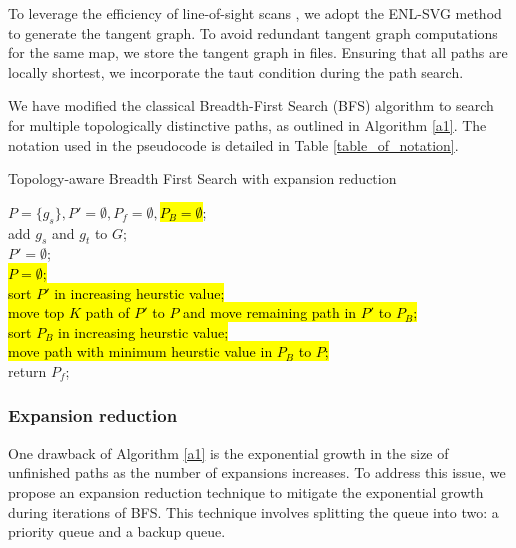 \documentclass[lettersize,journal]{IEEEtran}
\begin{document}
To leverage the efficiency of line-of-sight scans \cite{oh2017edge}, we adopt the ENL-SVG method \cite{oh2017edge} to generate the tangent graph. To avoid redundant tangent graph computations for the same map, we store the tangent graph in files. Ensuring that all paths are locally shortest, we incorporate the taut condition \cite{oh2017edge} during the path search.

We have modified the classical Breadth-First Search (BFS) algorithm to search for multiple topologically distinctive paths, as outlined in Algorithm \ref{a1}. The notation used in the pseudocode is detailed in Table \ref{table_of_notation}.

\begin{algorithm}[t] 
 \normalem
\label{a2}
  \caption{Topology-aware Breadth First Search with expansion reduction}
  $P = \{g_s\}, P' = \emptyset, P_f = \emptyset, $\hl{$P_B = \emptyset$}; \\
  add $g_s$ and $g_t$ to $G$; \\
   {
     $P' = \emptyset$; \\
      {
     }
     \hl{$P = \emptyset$;} \\
     \hl{sort $P'$ in increasing heurstic value;} \\
     \hl{move top $K$ path of $P'$ to $P$ and move remaining path in $P'$ to $P_B$;} \\
     \hl{sort $P_B$ in increasing heurstic value;} \\
      {
	   {
	  \hl{move path with minimum heurstic value in $P_B$ to $P$;} \\	  
	  }     
     }		  		  
  } 
  return $P_f$;
\end{algorithm}


\subsubsection{Expansion reduction}    
One drawback of Algorithm \ref{a1} is the exponential growth in the size of unfinished paths as the number of expansions increases. To address this issue, we propose an expansion reduction technique to mitigate the exponential growth during iterations of BFS. This technique involves splitting the queue into two: a priority queue and a backup queue.
\end{document}
